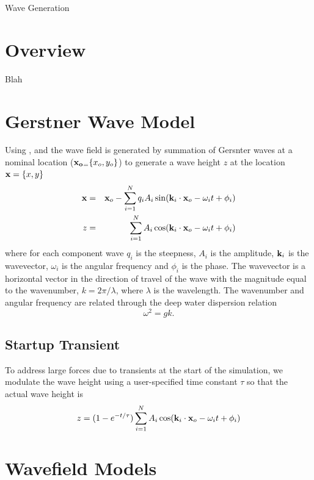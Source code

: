 \documentclass[11pt]{article}
\newcommand{\doctitle}{Wave Generation}
\begin{document}
  

\newpage
\setcounter{page}{1}
\begin{center}
{\huge \doctitle}
\end{center}


\section{Overview}
Blah

\section{Gerstner Wave Model}

Using \cite{tessendorf99simulating}, \cite{gpugems_waves} and \cite{frechot06realistic} the wave field is generated by summation of Gersnter waves at a nominal location ($\mbox{${\bf x_o}_{=}$} \{x_o, y_o\}$) to generate a wave height $z$ at the location $\mbox{${\bf x}$} = \{x, y\}$
\begin{eqnarray}
  \mbox{${\bf x}$} & = & \mbox{${\bf x}_{o}$} - \sum_{i=1}^{N} q_i A_i \sin(\mbox{${\bf k}_{i}$} \cdot \mbox{${\bf x}_{o}$} - \omega_i t + \phi_i) \\
  z & = & \sum_{i=1}^N A_i \cos(\mbox{${\bf k}_{i}$} \cdot \mbox{${\bf x}_{o}$} - \omega_i t + \phi_i)
  \label{e:gerstner}
\end{eqnarray}
where for each component wave $q_i$ is the steepness, $A_i$ is the amplitude, $\mbox{${\bf k}_{i}$}$ is the wavevector, $\omega_i$ is the angular frequency and $\phi_i$ is the phase.  The wavevector is a horizontal vector in the direction of travel of the wave with the magnitude equal to the wavenumber, $k=2\pi/\lambda$, where $\lambda$ is the wavelength.  The wavenumber and angular frequency are related through the deep water dispersion relation
\begin{equation}
  \omega^2 = gk.
\end{equation}

\subsection{Startup Transient}
To address large forces due to transients at the start of the simulation, we modulate the wave height using a user-specified time constant $\tau$ so that the actual wave height is
\begin{equation}
  z  =  (1 - e^{-t/\tau}) \sum_{i=1}^N A_i \cos(\mbox{${\bf k}_{i}$} \cdot \mbox{${\bf x}_{o}$} - \omega_i t + \phi_i)
  \end{equation}

\section{Wavefield Models}
\end{document}
